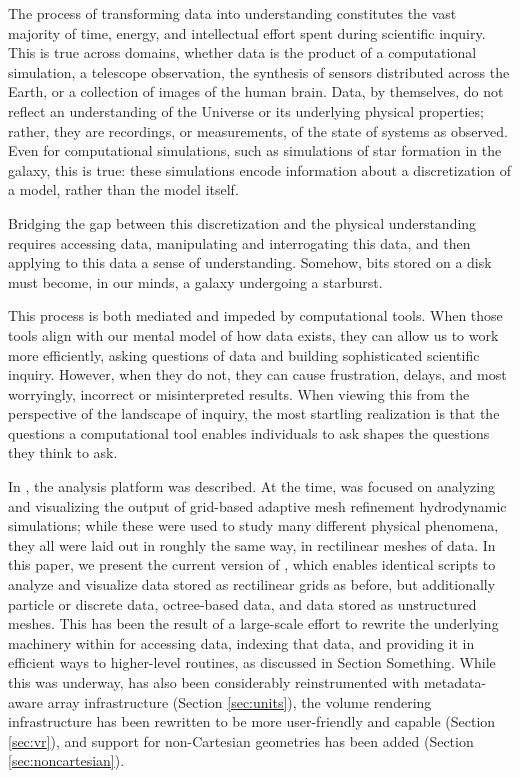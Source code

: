 The process of transforming data into understanding constitutes the vast
majority of time, energy, and intellectual effort spent during scientific
inquiry.  This is true across domains, whether data is the product of a
computational simulation, a telescope observation, the synthesis of sensors
distributed across the Earth, or a collection of images of the human brain.
Data, by themselves, do not reflect an understanding of the Universe or its
underlying physical properties; rather, they are recordings, or measurements,
of the state of systems as observed.  Even for computational simulations, such
as simulations of star formation in the galaxy, this is true: these simulations
encode information about a discretization of a model, rather than the model
itself.

Bridging the gap between this discretization and the physical understanding
requires accessing data, manipulating and interrogating this data, and then
applying to this data a sense of understanding.  Somehow, bits stored on a disk
must become, in our minds, a galaxy undergoing a starburst.

This process is both mediated and impeded by computational tools.  When those
tools align with our mental model of how data exists, they can allow us to work
more efficiently, asking questions of data and building sophisticated
scientific inquiry.  However, when they do not, they can cause frustration,
delays, and most worryingly, incorrect or misinterpreted results.  When viewing
this from the perspective of the landscape of inquiry, the most startling
realization is that the questions a computational tool enables
individuals to ask shapes the questions they think to ask.

In \cite{yt_method_paper}, the analysis platform \yt{} was described.  At the
time, \yt{} was focused on analyzing and visualizing the output of grid-based
adaptive mesh refinement hydrodynamic simulations; while these were used to
study many different physical phenomena, they all were laid out in roughly the
same way, in rectilinear meshes of data.  In this paper, we present the current
version of \yt{}, which enables identical scripts to analyze and visualize data
stored as rectilinear grids as before, but additionally particle or discrete
data, octree-based data, and data stored as unstructured meshes.  This has been
the result of a large-scale effort to rewrite the underlying machinery within
\yt{} for accessing data, indexing that data, and providing it in efficient
ways to higher-level routines, as discussed in Section Something.  While this
was underway, \yt{} has also been considerably reinstrumented with
metadata-aware array infrastructure (Section \ref{sec:units}), the volume
rendering infrastructure has been rewritten to be more user-friendly and
capable (Section \ref{sec:vr}), and support for non-Cartesian geometries has
been added (Section \ref{sec:noncartesian}).

